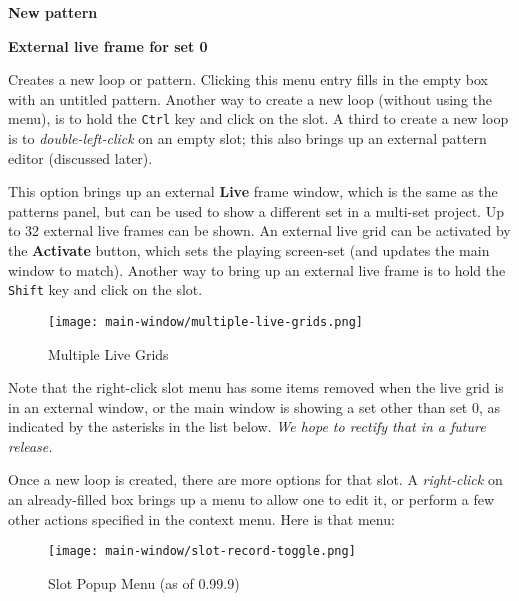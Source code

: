    \begin{enumber}
      \item \textbf{New pattern}
      \item \textbf{External live frame for set 0}
   \end{enumber}

   \setcounter{ItemCounter}{0}      %

   Creates a new loop or pattern.
   Clicking this menu entry fills in the empty box with an untitled
   pattern.
   Another way to create a new loop (without using the menu), is
   to hold the \texttt{Ctrl} key and click on the slot.
   A third to create a new loop is to
   \textsl{double-left-click} on an
   empty slot; this also brings up an external pattern editor (discussed
   later).

   This option brings up an external \textbf{Live} frame window, which
   is the same as the patterns panel, but can be used to show a different set
   in a multi-set project.  Up to 32 external live frames can be shown.
   An external live grid can be activated by the \textbf{Activate} button,
   which sets the playing screen-set
   (and updates the main window to match).
   Another way to bring up an external live frame
   is to hold the \texttt{Shift} key and click on the slot.

\begin{figure}[H]
   \centering 
   \texttt{[image: main-window/multiple-live-grids.png]}
   \caption{Multiple Live Grids}
   \label{fig:multiple_live_grids}
\end{figure}

   Note that the right-click slot menu has some items removed when the live
   grid is in an external window, or the main window is showing a set other
   than set 0, as indicated by
   the asterisks in the list below.
   \textsl{We hope to rectify that in a future release.}

   Once a new loop is created, there are more options for that slot.
   A \textsl{right-click} on an already-filled box brings up a menu
   to allow one to edit it, or perform a few other actions
   specified in the context menu.  Here is that menu:

\begin{figure}[H]
   \centering 
   \texttt{[image: main-window/slot-record-toggle.png]}
   \caption{Slot Popup Menu (as of 0.99.9)}
   \label{fig:slot_record_toggle}
\end{figure}

